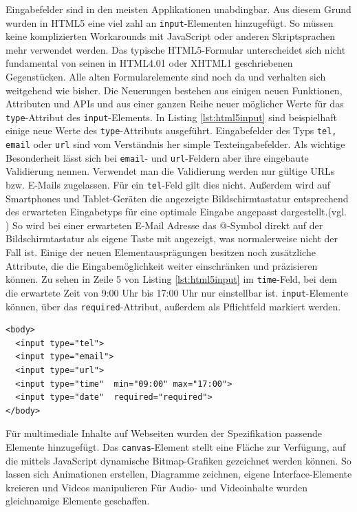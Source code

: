 Eingabefelder sind in den meisten Applikationen unabdingbar. Aus diesem Grund wurden in HTML5 eine viel zahl an \texttt{input}-Elementen hinzugefügt. So müssen keine komplizierten Workarounds mit JavaScript oder anderen Skriptsprachen mehr verwendet werden. \glqq Das typische HTML5-Formular unterscheidet sich nicht fundamental von seinen in HTML4.01 oder XHTML1 geschriebenen Gegenstücken. Alle alten Formularelemente sind noch da und verhalten sich weitgehend wie bisher. Die Neuerungen bestehen aus einigen neuen Funktionen, Attributen und APIs und aus einer ganzen Reihe neuer möglicher Werte für das \texttt{type}-Attribut des \texttt{input}-Elements.\grqq{}\cite[S.176]{KronHTML2011} In Listing \ref{lst:html5input} sind beispielhaft einige neue Werte des \texttt{type}-Attributs ausgeführt. Eingabefelder des Typs \texttt{tel, email} oder \texttt{url} sind vom Verständnis her simple Texteingabefelder. Als wichtige Besonderheit lässt sich bei \texttt{email}- und \texttt{url}-Feldern aber ihre eingebaute Validierung nennen. Verwendet man die Validierung werden nur gültige URLs bzw. E-Mails zugelassen. Für ein \texttt{tel}-Feld gilt dies nicht. Außerdem wird auf Smartphones und Tablet-Geräten die angezeigte Bildschirmtastatur entsprechend des erwarteten Eingabetyps für eine optimale Eingabe angepasst dargestellt.(vgl. \cite[S.178]{KronHTML2011}) So wird bei einer erwarteten E-Mail Adresse das @-Symbol direkt auf der Bildschirmtastatur als eigene Taste mit angezeigt, was normalerweise nicht der Fall ist. Einige der neuen Elementausprägungen besitzen noch zusätzliche Attribute, die die Eingabemöglichkeit weiter einschränken und präzisieren können. Zu sehen in Zeile 5 von Listing \ref{lst:html5input} im \texttt{time}-Feld, bei dem die erwartete Zeit von 9:00 Uhr bis 17:00 Uhr nur einstellbar ist. \texttt{input}-Elemente können, über das \texttt{required}-Attribut, außerdem als Pflichtfeld markiert werden.

\vspace{1em}
\begin{lstlisting}[language=HTML5, caption=HTML5 \texttt{input}-Element, label=lst:html5input]
<body>
  <input type="tel">
  <input type="email">
  <input type="url">  
  <input type="time"  min="09:00" max="17:00">
  <input type="date"  required="required">
</body>
\end{lstlisting}
	
Für multimediale Inhalte auf Webseiten wurden der Spezifikation passende Elemente hinzugefügt. Das \texttt{canvas}-Element \glqq [...] stellt eine Fläche zur Verfügung, auf die mittels JavaScript dynamische Bitmap-Grafiken gezeichnet werden können. So lassen sich Animationen erstellen, Diagramme zeichnen, eigene Interface-Elemente kreieren und Videos manipulieren\grqq{}\cite[S.353]{KronHTML2011} Für Audio- und Videoinhalte wurden gleichnamige Elemente geschaffen. 
	
